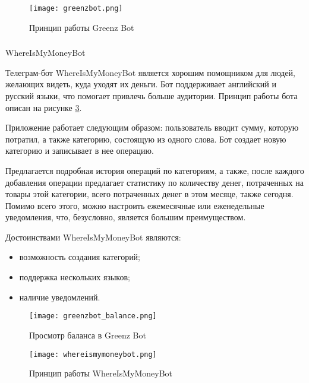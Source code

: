 \begin{figure}[!h]
	\centering
	\texttt{[image: greenzbot.png]} 
	\caption{Принцип работы Greenz Bot}
	\label{fig:analysis:analogues:greenz}
\end{figure}

\subsubsection{} WhereIsMyMoneyBot
\label{sec:analysis:analogues:whereismymoney}

Телеграм-бот WhereIsMyMoneyBot является хорошим помощником \linebreak для людей, желающих видеть, куда уходят их деньги. Бот поддерживает английский и русский языки, что помогает привлечь больше аудитории. Принцип работы бота описан на рисунке \ref{fig:analysis:analogues:whereismymoneybot}.

Приложение работает следующим образом: пользователь вводит сумму, которую потратил, а также категорию, состоящую из одного слова. Бот создает новую категорию и записывает в нее операцию.

Предлагается подробная история операций по категориям, а также, после каждого добавления операции предлагает статистику по количеству денег, потраченных на товары этой категории, всего потраченных денег в этом месяце, также сегодня. Помимо всего этого, можно настроить ежемесячные или еженедельные уведомления, что, безусловно, является большим преимуществом.

Достоинствами WhereIsMyMoneyBot являются:

\begin{itemize}
	\item возможность создания категорий;
	\item поддержка нескольких языков;
	\item наличие уведомлений.
\end{itemize}

\begin{figure}[!h]
	\centering
	\texttt{[image: greenzbot\_balance.png]} 
	\caption{Просмотр баланса в Greenz Bot}
	\label{fig:analysis:analogues:greenz_balance}
\end{figure}

\begin{figure}[!h]
	\centering
	\texttt{[image: whereismymoneybot.png]} 
	\caption{Принцип работы WhereIsMyMoneyBot}
	\label{fig:analysis:analogues:whereismymoneybot}
\end{figure}


